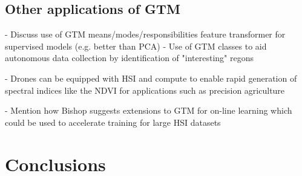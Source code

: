 \documentclass[remotesensing,article,submit,pdftex,moreauthors]{Definitions/mdpi}
\begin{document}
\subsection{Other applications of GTM}
- Discuss use of GTM means/modes/responsibilities feature transformer for supervised models (e.g. better than PCA) 
- Use of GTM classes to aid autonomous data collection by identification of "interesting" regons


- Drones can be equipped with HSI and compute to enable rapid generation of spectral indices like the NDVI for applications such as precision agriculture \cite{horstrand2019uav}

- Mention how Bishop suggests extensions to GTM for on-line learning which could be used to accelerate training for large HSI datasets


\section{Conclusions}


\vspace{6pt} 



\end{document}
